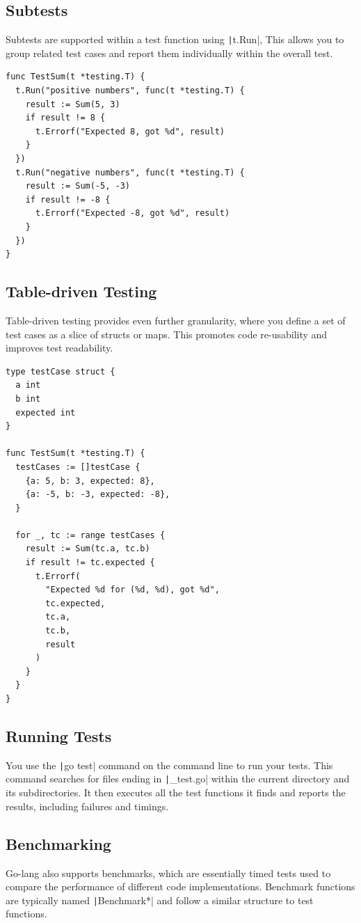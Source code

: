 \documentclass[letterpaper,12pt]{article}
\begin{document}
\subsection{Subtests}
Subtests are supported within a test function using \texttt|t.Run|, This allows you to group related test cases and report them individually within the overall test.
\begin{verbatim}
func TestSum(t *testing.T) {
  t.Run("positive numbers", func(t *testing.T) {
    result := Sum(5, 3)
    if result != 8 {
      t.Errorf("Expected 8, got %d", result)
    }
  })
  t.Run("negative numbers", func(t *testing.T) {
    result := Sum(-5, -3)
    if result != -8 {
      t.Errorf("Expected -8, got %d", result)
    }
  })
}
\end{verbatim}
\subsection{Table-driven Testing}
Table-driven testing provides even further granularity, where you define a set of test cases as a slice of structs or maps. This promotes code re-usability and improves test readability.
\begin{verbatim}
type testCase struct {
  a int
  b int
  expected int
}

func TestSum(t *testing.T) {
  testCases := []testCase {
    {a: 5, b: 3, expected: 8},
    {a: -5, b: -3, expected: -8},
  }

  for _, tc := range testCases {
    result := Sum(tc.a, tc.b)
    if result != tc.expected {
      t.Errorf(
        "Expected %d for (%d, %d), got %d",
        tc.expected,
        tc.a,
        tc.b,
        result
      )
    }
  }
}
\end{verbatim}
\subsection{Running Tests}
You use the \texttt|go test| command on the command line to run your tests. This command searches for files ending in \texttt|_test.go| within the current directory and its subdirectories.
It then executes all the test functions it finds and reports the results, including failures and timings.
\subsection{Benchmarking}
Go-lang also supports benchmarks, which are essentially timed tests used to compare the performance of different code implementations. Benchmark functions are typically named \texttt|Benchmark*| and follow a similar structure to test functions.
\end{document}
